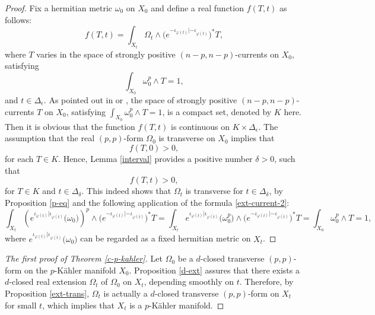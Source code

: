 \documentclass[12pt]{amsart}
\numberwithin{equation}{section}
\renewcommand{\1}{\mathds{1}}
\renewcommand{\>}{\rightarrow}
\begin{document}
\begin{proof}
Fix a hermitian metric $\omega_0$ on $X_0$ and define a real function $f(T,t)$ as follows:
\[ f(T,t) = \int_{X_t} \Omega_t \wedge \big(e^{-\iota_{\varphi(t)}|-\iota_{\overline{\varphi(t)}}} \big)^*T, \]
where $T$ varies in the space of strongly positive $(n-p,n-p)$-currents on $X_0$, satisfying
\[ \int_{X_0} \omega_0^p \wedge T =1, \]
and $t \in \Delta_{\epsilon}$. As pointed out in \cite[Propositon $1.7$]{aa} or \cite[Propositon I.5]{S}, the space of strongly positive $(n-p,n-p)$-currents $T$ on $X_0$, satisfying
$\int_{X_0} \omega_0^p \wedge T =1$, is a compact set, denoted by $K$ here. Then it is obvious that
the function $f(T,t)$ is continuous on $K \times \Delta_{\epsilon}$. The assumption that the real $(p,p)$-form $\Omega_0$ is transverse on $X_0$
implies that
\[ f(T,0)>0, \]
for each $T \in K$. Hence, Lemma \ref{interval} provides a positive number $\delta>0$, such that
\[ f(T,t)>0, \]
for $T \in K$ and $t\in \Delta_\delta$. This indeed shows that $\Omega_t$
is transverse for $t\in \Delta_\delta$, by Proposition \ref{p-eq} and the following application of
the formula \eqref{ext-current-2}:
\[ \int_{X_t} \left(e^{\iota_{\varphi(t)}|\iota_{\overline{\varphi(t)}}}\big(\omega_0\big)\right)^{p} \wedge \big(e^{-\iota_{\varphi(t)}|-\iota_{\overline{\varphi(t)}}} \big)^*T
= \int_{X_t} e^{\iota_{\varphi(t)}|\iota_{\overline{\varphi(t)}}}\big(\omega^p_0\big) \wedge \big(e^{-\iota_{\varphi(t)}|-\iota_{\overline{\varphi(t)}}} \big)^*T
= \int_{X_0} \omega_0^p \wedge T =1,\]
where $e^{\iota_{\varphi(t)}|\iota_{\overline{\varphi(t)}}}\big(\omega_0\big)$ can be regarded as a fixed hermitian metric on $X_t$.
\end{proof}

\begin{proof}[The first proof of Theorem \ref{c-p-kahler}]
Let $\Omega_0$ be a $d$-closed transverse $(p,p)$-form on the $p$-K\"ahler manifold $X_0$. Proposition \ref{d-ext} assures that
there exists a $d$-closed real extension $\Omega_t$ of $\Omega_0$ on $X_t$, depending smoothly on $t$.
Therefore, by Proposition \ref{ext-trans}, $\Omega_t$ is actually a $d$-closed transverse $(p,p)$-form
on $X_t$ for small $t$, which implies that $X_t$ is a $p$-K\"ahler manifold.
\end{proof}
\end{document}
